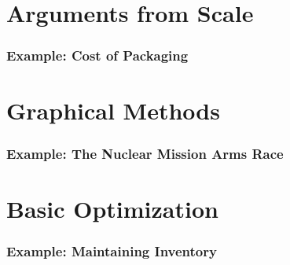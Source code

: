 \documentclass[compress,handout,10pt]{beamer}
\begin{document}
\section{Arguments from Scale}

\begin{frame}
    \frametitle{Example: Cost of Packaging}
\end{frame}

\section{Graphical Methods}
\begin{frame}
    \frametitle{Example: The Nuclear Mission Arms Race}
\end{frame}

\section{Basic Optimization}
\begin{frame}
    \frametitle{Example: Maintaining Inventory}
\end{frame}
\end{document}

